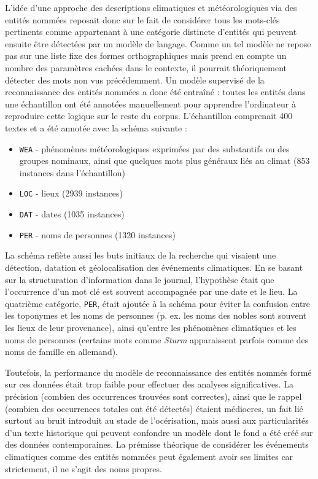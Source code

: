 \documentclass[a4paper,twoside,12pt]{article}
\begin{document}
\label{NER_model}
L'idée d'une approche des descriptions climatiques et météorologiques via des entités nommées reposait donc sur le fait de considérer tous les mots-clés pertinents comme appartenant à une catégorie distincte d'entités qui peuvent ensuite être détectées par un modèle de langage. Comme un tel modèle ne repose pas sur une liste fixe des formes orthographiques mais prend en compte un nombre des paramètres cachées dans le contexte, il pourrait théoriquement détecter des mots non vus précédemment. Un modèle supervisé de la reconnaissance des entités nommées a donc été entraîné : toutes les entités dans une échantillon ont été annotées manuellement pour apprendre l'ordinateur à reproduire cette logique sur le reste du corpus. L'échantillon comprenait 400 textes et a été annotée avec la schéma suivante :

\vspace{1ex}
\begin{itemize}[label=$\bullet$]
    \item \texttt{WEA} - phénomènes météorologiques exprimées par des substantifs ou des groupes nominaux, ainsi que quelques mots plus généraux liés au climat (853 instances dans l'échantillon) 
    \item \texttt{LOC} - lieux (2939 instances)
    \item \texttt{DAT} - dates (1035 instances)
    \item \texttt{PER} - noms de personnes (1320 instances)
\end{itemize}
\vspace{2ex}

La schéma reflète aussi les buts initiaux de la recherche qui visaient une détection, datation et géolocalisation des événements climatiques. En se basant sur la structuration d'information dans le journal, l'hypothèse était que l'occurrence d'un mot clé est souvent accompagnée par une date et le lieu. La quatrième catégorie, \texttt{PER}, était ajoutée à la schéma pour éviter la confusion entre les toponymes et les noms de personnes (p. ex. les noms des nobles sont souvent les lieux de leur provenance), ainsi qu'entre les phénomènes climatiques et les noms de personnes (certains mots comme \textit{Sturm} apparaissent parfois comme des noms de famille en allemand).

Toutefois, la performance du modèle de reconnaissance des entités nommés formé sur ces données était trop faible pour effectuer des analyses significatives. La précision (combien des occurrences trouvées sont correctes), ainsi que le rappel (combien des occurrences totales ont été détectés) étaient médiocres, un fait lié surtout au bruit introduit au stade de l'océrisation, mais aussi aux particularités d'un texte historique qui peuvent confondre un modèle dont le fond a été créé sur des données contemporaines. La prémisse théorique de considérer les événements climatiques comme des entités nommées peut également avoir ses limites car strictement, il ne s'agit des noms propres.
\end{document}
